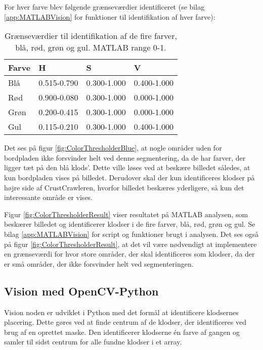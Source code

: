 
For hver farve blev følgende grænseværdier identificeret (se bilag \vref{app:MATLABVision} for funktioner til identifikation af hver farve):
\begin{table}[H]
\centering
\begin{tabular}{l|l|l|l}
Farve	&	H			&	S			&	V\\
\hline
Blå		&	0.515-0.790	&	0.300-1.000	&	0.400-1.000\\
Rød		&	0.900-0.080	&	0.300-1.000	&	0.000-1.000\\
Grøn	&	0.200-0.415	&	0.300-1.000	&	0.000-1.000\\
Gul		&	0.115-0.210	&	0.300-1.000	&	0.400-1.000\\
\end{tabular}	
\caption{Grænseværdier til identifikation af de fire farver, blå, rød, grøn og gul. MATLAB range 0-1.}
\end{table}

Det ses på figur \vref{fig:ColorThresholderBlue}, at nogle områder uden for bordpladen ikke forsvinder helt ved denne segmentering, da de har farver, der ligger tæt på den blå klods'.
Dette ville løses ved at beskære billedet således, at kun bordpladen vises på billedet.
Derudover skal der kun identificeres klodser på højre side af CrustCrawleren, hvorfor billedet beskæres yderligere, så kun det interessante område er vises.

Figur \vref{fig:ColorThresholderResult} viser resultatet på MATLAB analysen, som beskærer billedet og identificerer klodser i de fire farver, blå, rød, grøn og gul.
Se bilag \vref{app:MATLABVision} for script og funktioner brugt i analysen.
Det ses også på figur \ref{fig:ColorThresholderResult}, at det vil være nødvendigt at implementere en grænseværdi for hvor store områder, der skal identificeres som klodser, da der er små områder, der ikke forsvinder helt ved segmenteringen.


\subsection{Vision med OpenCV-Python}
Vision noden er udviklet i Python med det formål at identificere klodsernes placering.
Dette gøres ved at finde centrum af de klodser, der identificeres ved brug af en oprettet maske.
Den identificerer klodserne én farve af gangen og samler til sidst centrum for alle fundne klodser i et array.

